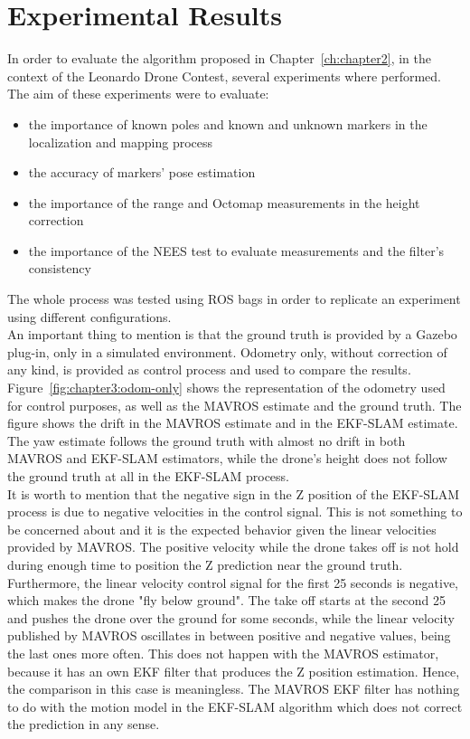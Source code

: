 \chapter{Experimental Results}
\label{ch:chapter3}
In order to evaluate the algorithm proposed in Chapter~\ref{ch:chapter2}, in the context of the Leonardo Drone Contest, several experiments where performed. The aim of these experiments were to evaluate:
\begin{itemize}
    \item{the importance of known poles and known and unknown markers in the localization and mapping process}
    \item{the accuracy of markers' pose estimation}
    \item{the importance of the range and Octomap measurements in the height correction}
    \item{the importance of the \ac{NEES} test to evaluate measurements and the filter's consistency}
\end{itemize}
The whole process was tested using \ac{ROS} bags in order to replicate an experiment using different configurations.\\

An important thing to mention is that the ground truth is provided by a Gazebo plug-in, only in a simulated environment. Odometry only, without correction of any kind, is provided as control process and used to compare the results. \\

Figure~\ref{fig:chapter3:odom-only} shows the representation of the odometry used for control purposes, as well as the MAVROS estimate and the ground truth. The figure shows the drift in the MAVROS estimate and in the EKF-SLAM estimate. The yaw estimate follows the ground truth with almost no drift in both MAVROS and EKF-SLAM estimators, while the drone's height does not follow the ground truth at all in the EKF-SLAM process.\\

It is worth to mention that the negative sign in the Z position of the EKF-SLAM process is due to negative velocities in the control signal. This is not something to be concerned about and it is the expected behavior given the linear velocities provided by MAVROS. The positive velocity while the drone takes off is not hold during enough time to position the Z prediction near the ground truth. Furthermore, the linear velocity control signal for the first 25 seconds is negative, which makes the drone "fly below ground". The take off starts at the second 25 and pushes the drone over the ground for some seconds, while the linear velocity published by MAVROS oscillates in between positive and negative values, being the last ones more often. This does not happen with the MAVROS estimator, because it has an own \ac{EKF} filter that produces the Z position estimation. Hence, the comparison in this case is meaningless. The MAVROS \ac{EKF} filter has nothing to do with the motion model in the EKF-SLAM algorithm which does not correct the prediction in any sense.\\

